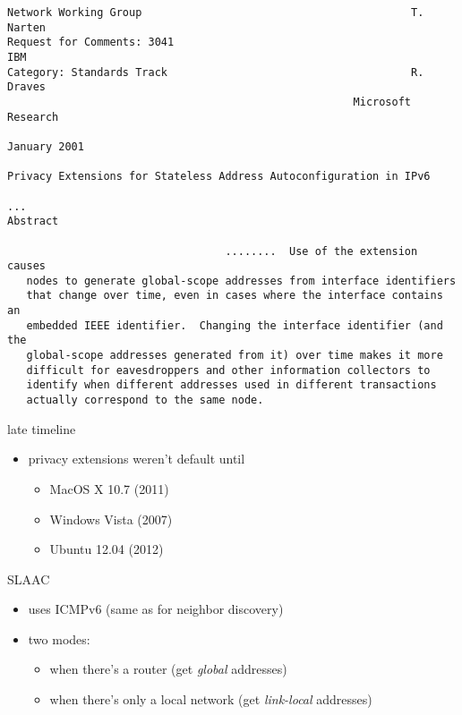 \begin{frame}[fragile]{}
\begin{Verbatim}[fontsize=\fontsize{9}{10}\selectfont]
Network Working Group                                          T. Narten
Request for Comments: 3041                                           IBM
Category: Standards Track                                      R. Draves
                                                      Microsoft Research
                                                                                                                  January 2001
                                                                                                                     Privacy Extensions for Stateless Address Autoconfiguration in IPv6

...
Abstract

                                  ........  Use of the extension causes
   nodes to generate global-scope addresses from interface identifiers
   that change over time, even in cases where the interface contains an
   embedded IEEE identifier.  Changing the interface identifier (and the
   global-scope addresses generated from it) over time makes it more
   difficult for eavesdroppers and other information collectors to
   identify when different addresses used in different transactions
   actually correspond to the same node.
\end{Verbatim}
\end{frame}

\begin{frame}{late timeline}
\begin{itemize}
\item privacy extensions weren't default until
    \begin{itemize}
    \item MacOS X 10.7 (2011)
    \item Windows Vista (2007)
    \item Ubuntu 12.04 (2012)
    \end{itemize}
\end{itemize}
\end{frame}

\begin{frame}{SLAAC}
\begin{itemize}
\item uses ICMPv6 (same as for neighbor discovery)
\item two modes:
    \begin{itemize}
    \item when there's a router (get \textit{global} addresses)
    \item when there's only a local network (get \textit{link-local} addresses)
    \end{itemize}
\end{itemize}
\end{frame}

